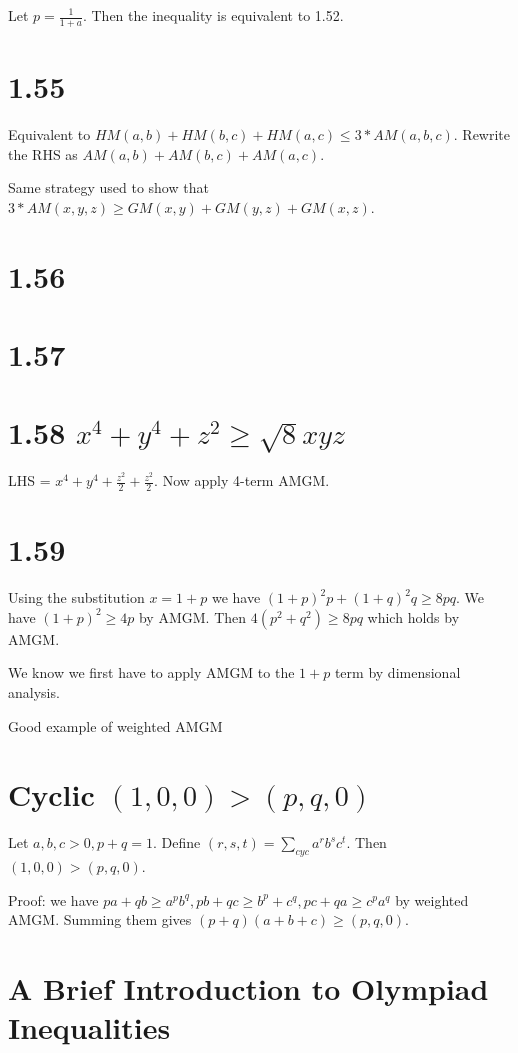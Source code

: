 \documentclass{article}
\begin{document}
Let $p = \frac{1}{1+a}$. Then the inequality is equivalent to 1.52.

\section*{1.55}

Equivalent to $HM(a, b) + HM(b, c) + HM(a, c) \le 3*AM(a, b, c)$. Rewrite the RHS as $AM(a, b) + AM(b, c) + AM(a, c)$.

Same strategy used to show that $3*AM(x, y, z) \ge GM(x, y) + GM(y, z) + GM(x, z)$.

\section*{1.56}

\section*{1.57}

\section*{1.58 $x^4 + y^4 + z^2 \ge \sqrt{8} xyz$}

LHS = $x^4 + y^4 + \frac{z^2}{2} + \frac{z^2}{2}$. Now apply 4-term AMGM.

\section*{1.59}

Using the substitution $x = 1+p$ we have $(1+p)^2p + (1+q)^2q \ge 8pq$. We have $(1 + p)^2 \ge 4p$ by AMGM. Then $4(p^2 + q^2) \ge 8pq$ which holds by AMGM.

We know we first have to apply AMGM to the $1+p$ term by dimensional analysis.

Good example of weighted AMGM

\section*{Cyclic $(1, 0, 0) > (p, q, 0)$}

Let $a, b, c > 0, p+q=1$. Define $(r, s, t) = \sum_{cyc} a^r b^s c^t$. Then $(1, 0, 0) > (p, q, 0)$.

Proof: we have $pa + qb \ge a^p b^q, pb + qc \ge b^p + c^q, pc + qa \ge c^p a^q$ by weighted AMGM. Summing them gives $(p+q)(a + b + c) \ge (p, q, 0)$.

\section*{A Brief Introduction to Olympiad Inequalities}
\end{document}
